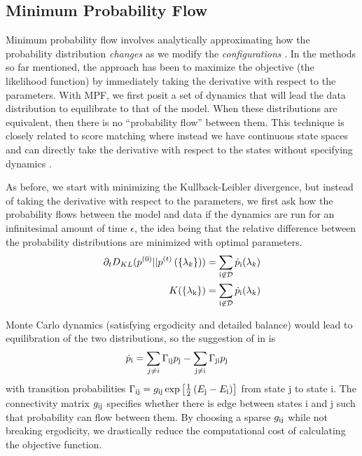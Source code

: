 \documentclass[aps,prl,twocolumn]{revtex4-1}
\begin{document}
\subsection{Minimum Probability Flow}
Minimum probability flow involves analytically approximating how the probability distribution \textit{changes} as we modify the \textit{configurations} \cite{SohlDickstein:2011im}. In the methods so far mentioned, the approach has been to maximize the objective (the likelihood function) by immediately taking the derivative with respect to the parameters. With MPF, we first posit a set of dynamics that will lead the data distribution to equilibrate to that of the model. When these distributions are equivalent, then there is no ``probability flow'' between them. This technique is closely related to score matching where instead we have continuous state spaces and can directly take the derivative with respect to the states without specifying dynamics \cite{Hyvarinen:2007ed}.

As before, we start with minimizing the Kullback-Leibler divergence, but instead of taking the derivative with respect to the parameters, we first ask how the probability flows between the model and data if the dynamics are run for an infinitesimal amount of time $\epsilon$, the idea being that the relative difference between the probability distributions are minimized with optimal parameters.
\begin{align}
	\partial_t D_{KL}(p^{(0)}||p^{(t)}\left(\{\lambda_k\}\right)) &= \sum_{\rm i \not\in \mathcal{D}} \dot{p}_{\rm i}(\lambda_k)\\
	K(\{\lambda_{\rm k}\}) &= \sum_{\rm i \not\in \mathcal{D}} \dot{p}_{\rm i}(\lambda_k)
\end{align}

Monte Carlo dynamics (satisfying ergodicity and detailed balance) would lead to equilibration of the two distributions, so the suggestion of in \cite{SohlDickstein:2011im} is
\begin{align}
	\dot{p}_{\rm i} &= \sum_{j\neq i} \Gamma_{\rm ij} p_{\rm j} -\sum_{\rm j\neq i} \Gamma_{\rm ji} p_{\rm j}
\end{align}
with transition probabilities $\Gamma_{\rm ij} = g_{\rm ij}\exp\left[ \frac{1}{2}\left( E_{\rm j}-E_{\rm i} \right) \right]$ from state j to state i. The connectivity matrix $g_{\rm ij}$ specifies whether there is edge between states i and j such that probability can flow between them. By choosing a sparse $g_{\rm ij}$ while not breaking ergodicity, we drastically reduce the computational cost of calculating the objective function.
\end{document}
